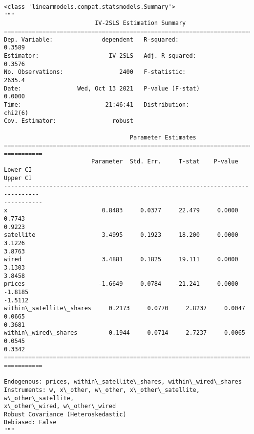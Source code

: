             \begin{tcolorbox}[breakable, size=fbox, boxrule=.5pt, pad at break*=1mm, opacityfill=0]
\begin{Verbatim}[commandchars=\\\{\}]
<class 'linearmodels.compat.statsmodels.Summary'>
"""
                          IV-2SLS Estimation Summary
==============================================================================
Dep. Variable:              dependent   R-squared:                      0.3589
Estimator:                    IV-2SLS   Adj. R-squared:                 0.3576
No. Observations:                2400   F-statistic:                    2635.4
Date:                Wed, Oct 13 2021   P-value (F-stat)                0.0000
Time:                        21:46:41   Distribution:                  chi2(6)
Cov. Estimator:                robust

                                    Parameter Estimates
================================================================================
===========
                         Parameter  Std. Err.     T-stat    P-value    Lower CI
Upper CI
--------------------------------------------------------------------------------
-----------
x                           0.8483     0.0377     22.479     0.0000      0.7743
0.9223
satellite                   3.4995     0.1923     18.200     0.0000      3.1226
3.8763
wired                       3.4881     0.1825     19.111     0.0000      3.1303
3.8458
prices                     -1.6649     0.0784    -21.241     0.0000     -1.8185
-1.5112
within\_satellite\_shares     0.2173     0.0770     2.8237     0.0047      0.0665
0.3681
within\_wired\_shares         0.1944     0.0714     2.7237     0.0065      0.0545
0.3342
================================================================================
===========

Endogenous: prices, within\_satellite\_shares, within\_wired\_shares
Instruments: w, x\_other, w\_other, x\_other\_satellite, w\_other\_satellite,
x\_other\_wired, w\_other\_wired
Robust Covariance (Heteroskedastic)
Debiased: False
"""
\end{Verbatim}
\end{tcolorbox}

